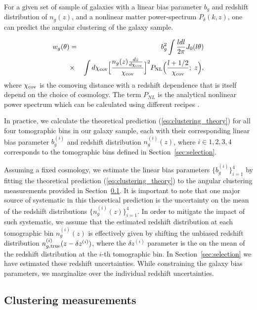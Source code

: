 \documentclass[fleqn,usenatbib,useAMS]{mnras}
\begin{document}
For a given set of sample of galaxies with a linear bias parameter $b_g$ and redshift distribution of $n_g(z)$, and a nonlinear matter power-spectrum $P_{\delta}(k,z)$, one can predict the angular clustering of the galaxy sample.

\begin{eqnarray}
w_{g}(\theta) &=& b_g^2 \int \frac{l dl}{2\pi}J_{0}(l\theta)  \nonumber \\ 
            &\times& \int d\chi_{\rm cov} \Big[\frac{n_{g}(z)\frac{dz}{d\chi_{\rm cov}}}{\chi_{\rm cov}}\Big]^{2}P_{\rm NL}\Big(\frac{l+1/2}{\chi_{\rm cov}}; \; z\Big),                  
\label{eq:clustering_theory}
\end{eqnarray}
where $\chi_{\rm cov}$ is the comoving distance with a redshift dependence that is itself depend on the choice of cosmology. The term $P_{NL}$ is the analytical nonlinear power spectrum which can be calculated using different recipes  \citep[e.g. ][]{takahashi2012, emu2014,mead2015, smith2019}.

In practice, we calculate the theoretical prediction (\ref{eq:clustering_theory}) for all four tomographic bins in our galaxy sample, each with their corresponding linear bias parameter $b^{(i)}_{g}$ and redshift distribution $n^{(i)}_{g}(z)$, where $i\in {1,2,3,4}$ corresponds to the tomographic bins defined in Section~\ref{sec:selection}.

Assuming a fixed cosmology, we estimate the linear bias parameters $\{b^{(i)}_{g}\}_{i=1}^{4}$ by fitting the theoretical prediction (\ref{eq:clustering_theory}) to the angular clustering measurements provided in Section~\ref{sec:measurement}. It is important to note that one major source of systematic in this theoretical prediction is the uncertainty on the mean of the redshift distributions $\{n_{g}^{(i)}(z)\}_{i=1}^{4}$. In order to mitigate the impact of such systematic, we assume that the estimated redshift distribution at each tomographic bin $n_{g}^{(i)}(z)$ is effectively given by shifting the unbiased redshift distribution $n_{g, \rm true}^{(i)}(z - \delta z^{(i)})$, where the $\delta z^{(i)}$ parameter is the on the mean of the redshift distribution at the $i$-th tomographic bin. In Section~\ref{sec:selection} we have estimated these redshift uncertainties. While constraining the galaxy bias parameters, we marginalize over the individual redshift uncertainties. 

\subsection{Clustering measurements}\label{sec:measurement}
\end{document}
